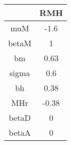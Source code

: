\begin{tabular}{|c|c|}
\hline
& RMH \\
\hline
muM & -1.6 \\
\hline
betaM & 1 \\
\hline
bm & 0.63 \\
\hline
sigma & 0.6 \\
\hline
bh & 0.38 \\
\hline
MHr & -0.38 \\
\hline
betaD & 0 \\
\hline
betaA & 0 \\
\hline
\end{tabular}
